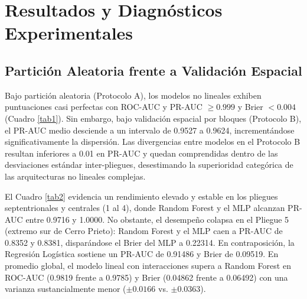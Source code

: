 \documentclass[10pt,twocolumn,a4paper]{article}
\begin{document}
\section{Resultados y Diagnósticos Experimentales}

\subsection{Partición Aleatoria frente a Validación Espacial}
Bajo partición aleatoria (Protocolo A), los modelos no lineales exhiben puntuaciones casi perfectas con ROC-AUC y PR-AUC $\ge 0.999$ y Brier $< 0.004$ (Cuadro \ref{tab1}). Sin embargo, bajo validación espacial por bloques (Protocolo B), el PR-AUC medio desciende a un intervalo de 0.9527 a 0.9624, incrementándose significativamente la dispersión. Las divergencias entre modelos en el Protocolo B resultan inferiores a 0.01 en PR-AUC y quedan comprendidas dentro de las desviaciones estándar inter-pliegues, desestimando la superioridad categórica de las arquitecturas no lineales complejas.

El Cuadro \ref{tab2} evidencia un rendimiento elevado y estable en los pliegues septentrionales y centrales (1 al 4), donde Random Forest y el MLP alcanzan PR-AUC entre 0.9716 y 1.0000. No obstante, el desempeño colapsa en el Pliegue 5 (extremo sur de Cerro Prieto): Random Forest y el MLP caen a PR-AUC de 0.8352 y 0.8381, disparándose el Brier del MLP a 0.22314. En contraposición, la Regresión Logística sostiene un PR-AUC de 0.91486 y Brier de 0.09519. En promedio global, el modelo lineal con interacciones supera a Random Forest en ROC-AUC (0.9819 frente a 0.9785) y Brier (0.04862 frente a 0.06492) con una varianza sustancialmente menor ($\pm 0.0166$ vs. $\pm 0.0363$).
\end{document}
